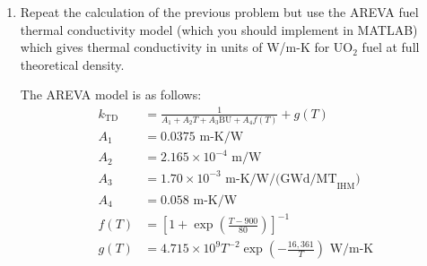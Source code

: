 \begin{fullwidth}
\begin{enumerate}
\vspace{1.0 cm}

\item Repeat the calculation of the previous problem but use the AREVA fuel thermal conductivity model (which you should implement in MATLAB) which gives thermal conductivity in units of W/m-K for UO$_2$ fuel at full theoretical density. 

The AREVA model is as follows:
\begin{align*}
k_{\text{TD}} &= \frac{1}{A_1 + A_2 T + A_3 \text{BU} + A_4 f(T)} + g(T) \\
A_1 &= 0.0375 \text{ m-K/W} \\
A_2 &= 2.165 \times 10^{-4} \text { m/W} \\
A_3 &= 1.70\times 10^{-3} \text{ m-K/W/(GWd/MT}_{\text{IHM}}\text{)} \\
A_4 &= 0.058 \text{ m-K/W} \\
f(T) &= \left[1 + \exp{\left(\frac{T-900}{80} \right)} \right]^{-1} \\
g(T) &= 4.715 \times 10^{9} T^{-2} \exp{\left(-\frac{16,361}{T} \right)} \text{ W/m-K} \\
\end{align*}
\end{enumerate}


\end{fullwidth}
